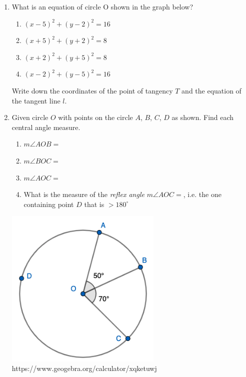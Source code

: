 \documentclass[12pt, twoside]{article}
\begin{document}
\begin{enumerate}
\newpage
\item What is an equation of circle O shown in the graph below?
  \begin{center}
  \end{center}
  \begin{multicols}{2}
    \begin{enumerate}
      \item $(x-5)^2+(y-2)^2=16$
      \item $(x+5)^2+(y+2)^2=8$
      \item $(x+2)^2+(y+5)^2=8$
      \item $(x-2)^2+(y-5)^2=16$
    \end{enumerate}
  \end{multicols}
  Write down the coordinates of the point of tangency $T$ and the equation of the tangent line $l$.

\newpage
\item Given circle $O$ with points on the circle $A$, $B$, $C$, $D$ as shown. Find each central angle measure.
\begin{multicols}{2}
  \begin{enumerate} 
    \item $m\angle AOB =$
    \item $m\angle BOC =$
    \item $m\angle AOC =$
    \item What is the measure of the \emph{reflex angle} $m\angle AOC =$, i.e. the one containing point $D$ that is $>180^\circ$
    \end{enumerate}
\columnbreak
    \includegraphics[width=7.5cm]{7-6-7_central_angles.png}
    https://www.geogebra.org/calculator/xqketuwj
\end{multicols}
     

\end{enumerate}
\end{document}

